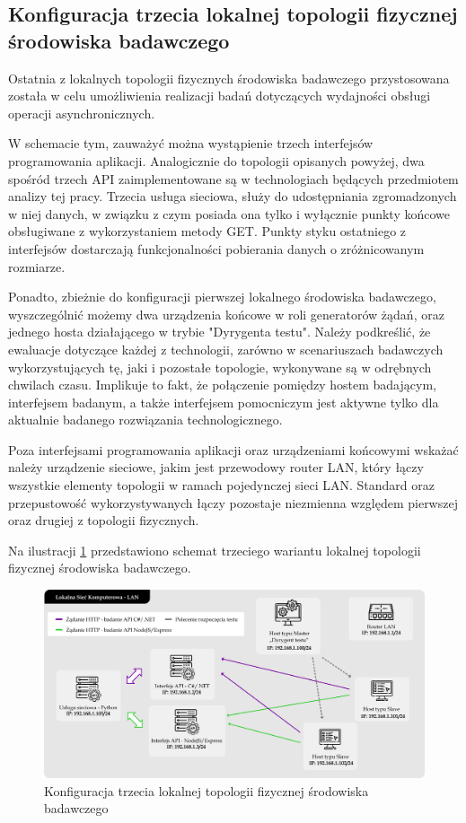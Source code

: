 \subsection*{Konfiguracja trzecia lokalnej topologii fizycznej środowiska badawczego}
\label{sec:lokalne-srodowisko-badawcze-ver-3}
Ostatnia z lokalnych topologii fizycznych środowiska badawczego przystosowana została w celu umożliwienia realizacji badań dotyczących wydajności obsługi operacji asynchronicznych.

W schemacie tym, zauważyć można wystąpienie trzech interfejsów programowania aplikacji. Analogicznie do topologii opisanych powyżej, dwa spośród trzech API zaimplementowane są w technologiach będących przedmiotem analizy tej pracy. Trzecia usługa sieciowa, służy do udostępniania zgromadzonych w niej danych, w związku z czym posiada ona tylko i wyłącznie punkty końcowe obsługiwane z wykorzystaniem metody GET. Punkty styku ostatniego z interfejsów dostarczają funkcjonalności pobierania danych o zróżnicowanym rozmiarze.

Ponadto, zbieżnie do konfiguracji pierwszej lokalnego środowiska badawczego, wyszczególnić możemy dwa urządzenia końcowe w roli generatorów żądań, oraz jednego hosta działającego w trybie "Dyrygenta testu". Należy podkreślić, że ewaluacje dotyczące każdej z technologii, zarówno w scenariuszach badawczych wykorzystujących tę, jaki i pozostałe topologie, wykonywane są w odrębnych chwilach czasu. Implikuje to fakt, że połączenie pomiędzy hostem badającym, interfejsem badanym, a także interfejsem pomocniczym jest aktywne tylko dla aktualnie badanego rozwiązania technologicznego.

Poza interfejsami programowania aplikacji oraz urządzeniami końcowymi wskażać należy urządzenie sieciowe, jakim jest przewodowy router LAN, który łączy wszystkie elementy topologii w ramach pojedynczej sieci LAN. Standard oraz przepustowość wykorzystywanych łączy pozostaje niezmienna względem pierwszej oraz drugiej z topologii fizycznych.

Na ilustracji \ref{fig:topologia-3} przedstawiono schemat trzeciego wariantu lokalnej topologii fizycznej środowiska badawczego.

\begin{figure}[ht]
    \centering
     \includegraphics[width=\linewidth]{rys04/topologia-3.png}
    \caption{Konfiguracja trzecia lokalnej topologii fizycznej środowiska badawczego}
    \label{fig:topologia-3}
\end{figure}

